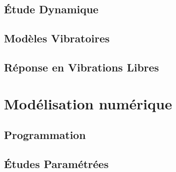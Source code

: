 \documentclass[a4paper,10pt]{report} %
\begin{document}
\section{Étude Dynamique}
\section{Modèles Vibratoires}
\section{Réponse en Vibrations Libres}
\chapter{Modélisation numérique}
\section{Programmation}
\section{Études Paramétrées}
\end{document}
